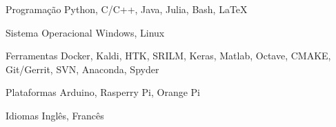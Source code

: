 

\begin{cvskills}

  \cvskill
    {Programação} %
    {Python, C/C++, Java, Julia, Bash, LaTeX} %

  \cvskill
    {Sistema Operacional} %
    {Windows, Linux} %

  \cvskill
    {Ferramentas} %
    {Docker, Kaldi, HTK, SRILM, Keras, Matlab, Octave, CMAKE, Git/Gerrit, SVN, Anaconda, Spyder} %

  \cvskill
    {Plataformas} %
    {Arduino, Rasperry Pi, Orange Pi} %

  \cvskill
    {Idiomas} %
    {Inglês, Francês} %

\end{cvskills}
